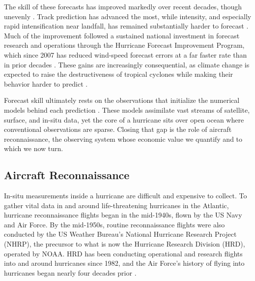 \documentclass[12pt]{article}%
\begin{document}
The skill of these forecasts has improved markedly over recent decades, though unevenly \citep{AlakaJr2024}. Track prediction has advanced the most, while intensity, and especially rapid intensification near landfall, has remained substantially harder to forecast \citep{Marks_Shay1998, Resnick2018, Enten2017, Norcross2018}. Much of the improvement followed a sustained national investment in forecast research and operations through the Hurricane Forecast Improvement Program, which since 2007 has reduced wind-speed forecast errors at a far faster rate than in prior decades \citep{GallEA2013, MarksEA2019, molina2024social}. These gains are increasingly consequential, as climate change is expected to raise the destructiveness of tropical cyclones \citep{mendelsohn2012impact, kossin2020global} while making their behavior harder to predict \citep{emanuel2017will}.

Forecast skill ultimately rests on the observations that initialize the numerical models behind each prediction \citep{HamillEA2012}. These models assimilate vast streams of satellite, surface, and in-situ data, yet the core of a hurricane sits over open ocean where conventional observations are sparse. Closing that gap is the role of aircraft reconnaissance, the observing system whose economic value we quantify and to which we now turn.

\subsection{Aircraft Reconnaissance}

In-situ measurements inside a hurricane are difficult and expensive to collect. To gather vital data in and around life-threatening hurricanes in the Atlantic, hurricane reconnaissance flights began in the mid-1940s, flown by the US Navy and Air Force. By the mid-1950s, routine reconnaissance flights were also conducted by the US Weather Bureau’s National Hurricane Research Project (NHRP), the precursor to what is now the Hurricane Research Division (HRD), operated by NOAA. HRD has been conducting operational and research flights into and around hurricanes since 1982, and the Air Force's history of flying into hurricanes began nearly four decades prior \citep{Sheets1990,Marks_Shay1998}.
\end{document}
